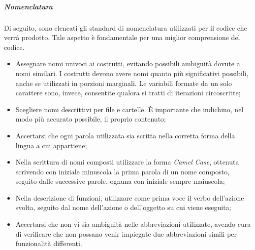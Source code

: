 			\subparagraph{Nomenclatura}
			Di seguito, sono elencati gli standard di nomenclatura utilizzati per il codice che verrà prodotto. Tale aspetto è fondamentale per una miglior comprensione del codice.
			\begin{itemize}
			\item Assegnare nomi univoci ai costrutti, evitando possibili ambiguità dovute a nomi similari. I costrutti devono avere nomi quanto più significativi possibili, anche se utilizzati in porzioni marginali. Le variabili formate da un solo carattere sono, invece, consentite qualora si tratti di iterazioni circoscritte;
			\item Scegliere nomi descrittivi per file e cartelle. \MakeUppercase{è} importante che indichino, nel modo più accurato possibile, il proprio contenuto;
			\item Accertarsi che ogni parola utilizzata sia scritta nella corretta forma della lingua a cui appartiene;
			\item Nella scrittura di nomi composti utilizzare la forma \textit{Camel Case}, ottenuta scrivendo con iniziale minuscola la prima parola di un nome composto, seguito dalle successive parole, ognuna con iniziale sempre maiuscola;
			\item Nella descrizione di funzioni, utilizzare come prima voce il verbo dell'azione svolta, seguito dal nome dell'azione o dell'oggetto su cui viene eseguita;
			\item Accertarsi che non vi sia ambiguità nelle abbreviazioni utilizzate, avendo cura di verificare che non possano venir impiegate due abbreviazioni simili per funzionalità differenti.
			\end{itemize}
					
